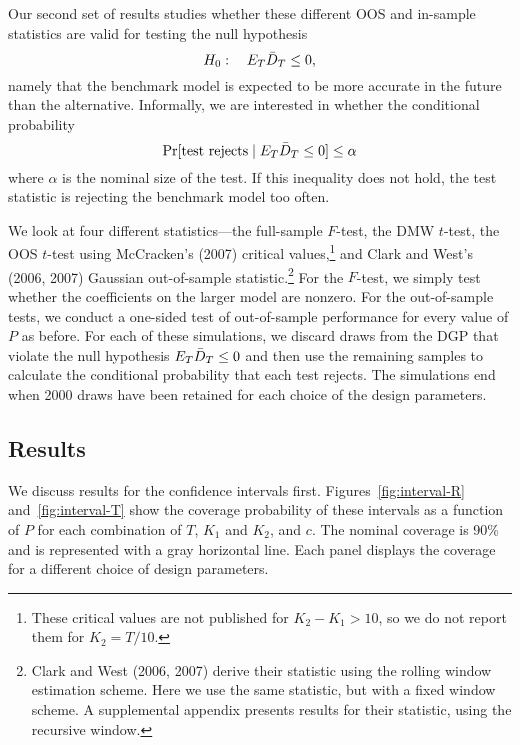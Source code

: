 \documentclass[12pt,draft]{article}
\begin{document}
Our second set of results studies whether these different OOS and
in-sample statistics are valid for testing the null hypothesis
\begin{equation*}
  H_0:\quad E_T \bar{D}_{T} \leq 0,
\end{equation*}
namely that the benchmark model is expected to be more accurate in the
future than the alternative. Informally, we are interested in whether
the conditional probability
\begin{equation*}
  \Pr[\text{test rejects} \mid E_T \bar{D}_{T} \leq 0] \leq \alpha
\end{equation*}
where $\alpha$ is the nominal size of the test. If this inequality
does not hold, the test statistic is rejecting the benchmark model too
often.

We look at four different statistics---the full-sample $F$-test, the
DMW $t$-test, the OOS $t$-test using McCracken's (2007) critical
values,\footnote{%
  These critical values are not published for $K_2-K_1>10$, so we do
  not report them for $K_2 = T/10$.} %
and Clark and West's (2006, 2007) Gaussian out-of-sample
statistic.\footnote{%
  Clark and West (2006, 2007) derive their statistic using the rolling
  window estimation scheme. Here we use the same statistic, but with a
  fixed window scheme. A supplemental appendix presents results for
  their statistic, using the recursive window.} %
For the $F$-test, we simply test whether the coefficients on the
larger model are nonzero.  For the out-of-sample tests, we conduct a
one-sided test of out-of-sample performance for every value of $P$ as
before. For each of these simulations, we discard draws from the DGP
that violate the null hypothesis $E_T \bar{D}_{T} \leq 0$ and then use the
remaining samples to calculate the conditional probability that each
test rejects. The simulations end when 2000 draws have been retained
for each choice of the design parameters.

\subsection{Results}

We discuss results for the confidence intervals first.
Figures~\ref{fig:interval-R} and~\ref{fig:interval-T} show the
coverage probability of these intervals as a function of $P$ for each
combination of $T$, $K_1$ and $K_2$, and $c$.  The nominal coverage is
90\% and is represented with a gray horizontal line. Each panel
displays the coverage for a different choice of design parameters.
\end{document}
